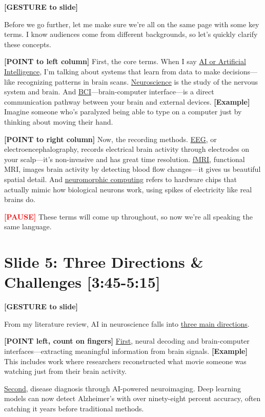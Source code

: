 \documentclass[12pt]{article}
\begin{document}
\textcolor{DukeBlue}{\textbf{[GESTURE to slide]}}

Before we go further, let me make sure we're all on the same page with some key terms. I know audiences come from different backgrounds, so let's quickly clarify these concepts.

\textcolor{DukeBlue}{\textbf{[POINT to left column]}} First, the core terms. When I say \ul{AI or Artificial Intelligence}, I'm talking about systems that learn from data to make decisions—like recognizing patterns in brain scans. \ul{Neuroscience} is the study of the nervous system and brain. And \ul{BCI}—brain-computer interface—is a direct communication pathway between your brain and external devices. \textcolor{green!60!black}{\textbf{[Example]}} Imagine someone who's paralyzed being able to type on a computer just by thinking about moving their hand.

\textcolor{DukeBlue}{\textbf{[POINT to right column]}} Now, the recording methods. \ul{EEG}, or electroencephalography, records electrical brain activity through electrodes on your scalp—it's non-invasive and has great time resolution. \ul{fMRI}, functional MRI, images brain activity by detecting blood flow changes—it gives us beautiful spatial detail. And \ul{neuromorphic computing} refers to hardware chips that actually mimic how biological neurons work, using spikes of electricity like real brains do.

\textcolor{red}{\textbf{[PAUSE]}} These terms will come up throughout, so now we're all speaking the same language.

\hrulefill

\section*{Slide 5: Three Directions \& Challenges [3:45-5:15]}

\textcolor{DukeBlue}{\textbf{[GESTURE to slide]}}

From my literature review, AI in neuroscience falls into \ul{three main directions}.

\textcolor{DukeBlue}{\textbf{[POINT left, count on fingers]}} \ul{First}, neural decoding and brain-computer interfaces—extracting meaningful information from brain signals. \textcolor{green!60!black}{\textbf{[Example]}} This includes work where researchers reconstructed what movie someone was watching just from their brain activity.

\ul{Second}, disease diagnosis through AI-powered neuroimaging. Deep learning models can now detect Alzheimer's with over ninety-eight percent accuracy, often catching it years before traditional methods.
\end{document}
